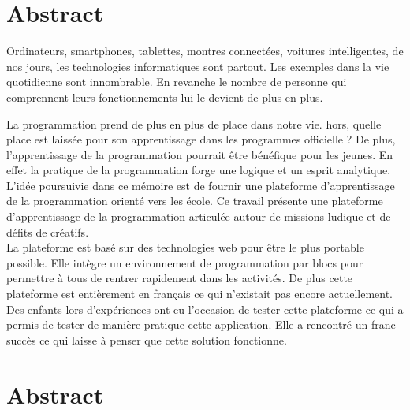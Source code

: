 \section*{Abstract}
Ordinateurs, smartphones, tablettes, montres connectées, voitures intelligentes, de nos jours, les technologies informatiques sont partout. Les exemples dans la vie quotidienne sont innombrable. En revanche le nombre de personne qui comprennent leurs fonctionnements lui le devient de plus en plus. 

La programmation prend de plus en plus de place dans notre vie. hors, quelle place est laissée pour son apprentissage dans les programmes officielle ? De plus, l'apprentissage de la programmation pourrait être bénéfique pour les jeunes. En effet la pratique de la programmation forge une logique et un esprit analytique.\\

L'idée poursuivie dans ce mémoire est de fournir une plateforme d'apprentissage de la programmation orienté vers les école. Ce travail présente une plateforme d'apprentissage de la programmation articulée autour de missions ludique et de défits de créatifs.\\

La plateforme est basé sur des technologies web pour être le plus portable possible. Elle intègre un environnement de programmation par blocs pour permettre à tous de rentrer rapidement dans les activités. De plus cette plateforme est entièrement en français ce qui n'existait pas encore actuellement.\\

Des enfants lors d'expériences ont eu l'occasion de tester cette plateforme ce qui a permis de tester de manière pratique cette application. Elle a rencontré un franc succès ce qui laisse à penser que cette solution fonctionne.

\section*{Abstract}

